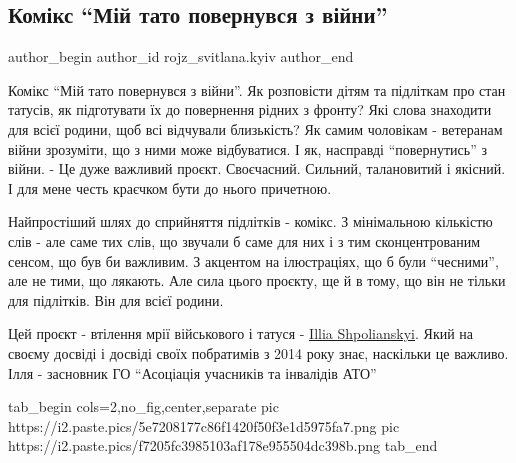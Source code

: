  
 
 
 
 

\subsection{Комікс \enquote{Мій тато повернувся з війни}}
\label{sec:26_06_2023.fb.rojz_svitlana.kyiv.1.komiks_mij_tato_povernuvsja_v_vijny}

\ifcmt
 author_begin
   author_id rojz_svitlana.kyiv
 author_end
\fi

Комікс \enquote{Мій тато повернувся з війни}. Як розповісти дітям та підліткам про стан
татусів, як підготувати їх до повернення рідних з фронту? Які слова знаходити
для всієї родини, щоб всі відчували близькість? Як самим чоловікам - ветеранам
війни зрозуміти, що з ними може відбуватися. І як, насправді \enquote{повернутись} з
війни.  - Це дуже важливий проєкт. Своєчасний. Сильний, талановитий і якісний.
І для мене честь краєчком бути до нього причетною.

Найпростіший шлях до сприйняття підлітків - комікс. З мінімальною кількістю
слів - але саме тих слів, що звучали б саме для них і з тим сконцентрованим
сенсом, що був би важливим. З акцентом на ілюстраціях, що б були \enquote{чесними}, але
не тими, що лякають. Але сила цього проєкту, ще й в тому, що він не тільки для
підлітків. Він для всієї родини.

Цей проєкт - втілення мрії військового і татуся - \href{https://www.facebook.com/shpolyanskiy}{Illia Shpolianskyi}. Який на
своєму досвіді і досвіді своїх побратимів з 2014 року знає, наскільки це
важливо. Ілля - засновник ГО \enquote{Асоціація учасників та інвалідів АТО}

\ifcmt
  tab_begin cols=2,no_fig,center,separate
     pic https://i2.paste.pics/5e7208177c86f1420f50f3e1d5975fa7.png
		 pic https://i2.paste.pics/f7205fc3985103af178e955504dc398b.png
  tab_end
\fi

